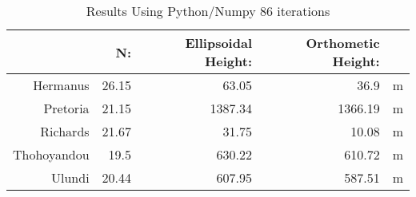 \begin{table}[htbp]
  \centering
  \caption{Results Using Python/Numpy 86 iterations}
    \begin{tabular}{rrrrr}
    \toprule
          & N:    & Ellipsoidal Height: & Orthometic Height: &  \\
    \midrule
    Hermanus & 26.15 & 63.05 & 36.9  & m \\
    Pretoria & 21.15 & 1387.34 & 1366.19 & m \\
    Richards & 21.67 & 31.75 & 10.08 & m \\
    Thohoyandou & 19.5  & 630.22 & 610.72 & m \\
    Ulundi & 20.44 & 607.95 & 587.51 & m \\
    \bottomrule
    \end{tabular}%
  \label{tab:addlabel}%
\end{table}%
